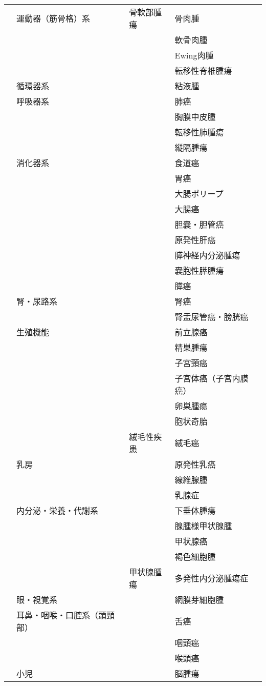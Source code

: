 \begin{xltabular}{\linewidth}{XXXX}
 & 運動器（筋骨格）系 & 骨軟部腫瘍 & 骨肉腫 \\
 &  &  & 軟骨肉腫 \\
 &  &  & Ewing肉腫 \\
 &  &  & 転移性脊椎腫瘍 \\
 & 循環器系 &  & 粘液腫 \\
 & 呼吸器系 &  & 肺癌 \\
 &  &  & 胸膜中皮腫 \\
 &  &  & 転移性肺腫瘍 \\
 &  &  & 縦隔腫瘍 \\
 & 消化器系 &  & 食道癌 \\
 &  &  & 胃癌 \\
 &  &  & 大腸ポリープ \\
 &  &  & 大腸癌 \\
 &  &  & 胆嚢・胆管癌 \\
 &  &  & 原発性肝癌 \\
 &  &  & 膵神経内分泌腫瘍 \\
 &  &  & 嚢胞性膵腫瘍 \\
 &  &  & 膵癌 \\
 & 腎・尿路系 &  & 腎癌 \\
 &  &  & 腎盂尿管癌・膀胱癌 \\
 & 生殖機能 &  & 前立腺癌 \\
 &  &  & 精巣腫瘍 \\
 &  &  & 子宮頸癌 \\
 &  &  & 子宮体癌（子宮内膜癌） \\
 &  &  & 卵巣腫瘍 \\
 &  &  & 胞状奇胎 \\
 &  & 絨毛性疾患 & 絨毛癌 \\
 & 乳房 &  & 原発性乳癌 \\
 &  &  & 線維腺腫 \\
 &  &  & 乳腺症 \\
 & 内分泌・栄養・代謝系 &  & 下垂体腫瘍 \\
 &  &  & 腺腫様甲状腺腫 \\
 &  &  & 甲状腺癌 \\
 &  &  & 褐色細胞腫 \\
 &  & 甲状腺腫瘍 & 多発性内分泌腫瘍症 \\
 & 眼・視覚系 &  & 網膜芽細胞腫 \\
 & 耳鼻・咽喉・口腔系（頭頸部） &  & 舌癌 \\
 &  &  & 咽頭癌 \\
 &  &  & 喉頭癌 \\
 & 小児 &  & 脳腫瘍 \\

\end{xltabular}
